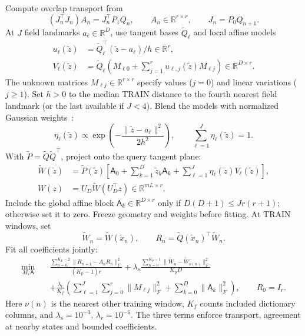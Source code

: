 \documentclass[11pt,a4paper]{article}
\newcommand{\R}{\mathbb R}
\begin{document}
Compute overlap transport from
\[
(J_n^\top J_n)A_n=J_n^\top P_1Q_n,\qquad A_n\in\R^{r\times r},
\qquad J_n=P_0Q_{n+1}.
\]
At $J$ field landmarks $a_\ell\in\R^D$, use tangent bases
$\widetilde Q_\ell$ and local affine models
\[
\begin{aligned}
u_\ell(\widetilde z)
&=\widetilde Q_\ell^\top(\widetilde z-a_\ell)/h\in\R^r,\\
V_\ell(\widetilde z)
&=\widetilde Q_\ell
\left(M_{\ell0}+\sum_{j=1}^r u_{\ell,j}(\widetilde z)M_{\ell j}\right)
\in\R^{D\times r}.
\end{aligned}
\]
The unknown matrices $M_{\ell j}\in\R^{r\times r}$ specify values
($j=0$) and linear variations ($j\ge1$).
Set $h>0$ to the median TRAIN distance to the fourth nearest field landmark
(or the last available if $J<4$).
Blend the models with normalized Gaussian weights~\citep{MelenkBabuska1996}:
\[
\eta_\ell(\widetilde z)\propto
\exp\!\left(-\frac{\|\widetilde z-a_\ell\|^2}{2h^2}\right),
\qquad \sum_{\ell=1}^J\eta_\ell(\widetilde z)=1.
\]
With $\widetilde P=\widetilde Q\widetilde Q^\top$, project onto the query tangent plane:
\[
\begin{aligned}
\widetilde W(\widetilde z)
&=\widetilde P(\widetilde z)
\left[\mathsf A_0+\sum_{k=1}^D\widetilde z_k\mathsf A_k+
\sum_{\ell=1}^J\eta_\ell(\widetilde z)V_\ell(\widetilde z)\right],\\
W(z)&=U_D\widetilde W(U_D^\top z)\in\R^{mL\times r}.
\end{aligned}
\]
Include the global affine block $\mathsf A_k\in\R^{D\times r}$ only if
$D(D+1)\le Jr(r+1)$; otherwise set it to zero.
Freeze geometry and weights before fitting. At TRAIN windows, set
\[
\widetilde W_n=\widetilde W(\widetilde x_n),\qquad
R_n=\widetilde Q(\widetilde x_n)^\top\widetilde W_n.
\]
Fit all coefficients jointly:
\[
\begin{aligned}
\min_{M,\mathsf A}\quad&
\frac{\sum_{n=0}^{K_{\mathrm p}-2}
\|R_{n+1}-A_nR_n\|_F^2}{(K_{\mathrm p}-1)r}
+\lambda_s\frac{\sum_{n=0}^{K_{\mathrm p}-1}
\|\widetilde W_n-\widetilde W_{\nu(n)}\|_F^2}{K_{\mathrm p}D}\\
&+\frac{\lambda_r}{K_f}\left(
\sum_{\ell=1}^J\sum_{j=0}^r\|M_{\ell j}\|_F^2+
\sum_{k=0}^D\|\mathsf A_k\|_F^2\right),\qquad R_0=I_r.
\end{aligned}
\]
Here $\nu(n)$ is the nearest other training window, $K_f$ counts included
dictionary columns, and $\lambda_s=10^{-3}$, $\lambda_r=10^{-6}$.
The three terms enforce transport, agreement at nearby states and bounded
coefficients.
\end{document}
